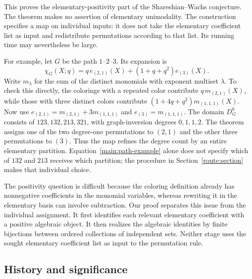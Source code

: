 This proves the elementary-positivity part of the Shareshian--Wachs
conjecture. The theorem makes no assertion of elementary unimodality.
The construction specifies a map on individual inputs: it does not take
the elementary coefficient list as input and redistribute permutations
according to that list. Its running time may nevertheless be large.

For example, let $G$ be the path $1$--$2$--$3$. Its expansion is
\begin{equation}
 \chi_G(X;q)=q\,e_{(2,1)}(X)+(1+q+q^2)e_{(3)}(X).
 \label{main:path-example}
\end{equation}
Write $m_\lambda$ for the sum of the distinct monomials with exponent
multiset $\lambda$. To check this directly, the colorings with a repeated color contribute
$q\,m_{(2,1)}(X)$, while those with three distinct colors contribute
$(1+4q+q^2)m_{(1,1,1)}(X)$. Now use
$e_{(2,1)}=m_{(2,1)}+3m_{(1,1,1)}$ and
$e_{(3)}=m_{(1,1,1)}$.
The domain $D_G^0$ consists of $123,132,213,321$, with graph-inversion
degrees $0,1,1,2$. The theorem assigns one of the two degree-one
permutations to $(2,1)$ and the other three permutations to $(3)$.
Thus the map refines the degree count by an entire elementary partition.
Equation~\eqref{main:path-example} alone does not specify which of
$132$ and $213$ receives which partition; the procedure in
Section~\ref{route:section} makes that individual choice.

The positivity question is difficult because the coloring definition
already has nonnegative coefficients in the monomial variables, whereas
rewriting it in the elementary basis can involve subtraction.  Our proof
separates this issue from the individual assignment.  It first identifies
each relevant elementary coefficient with a positive algebraic object.
It then realizes the algebraic identities by finite bijections between
ordered collections of independent sets. Neither stage uses the sought elementary
coefficient list as input to the permutation rule.

\subsection{History and significance}

